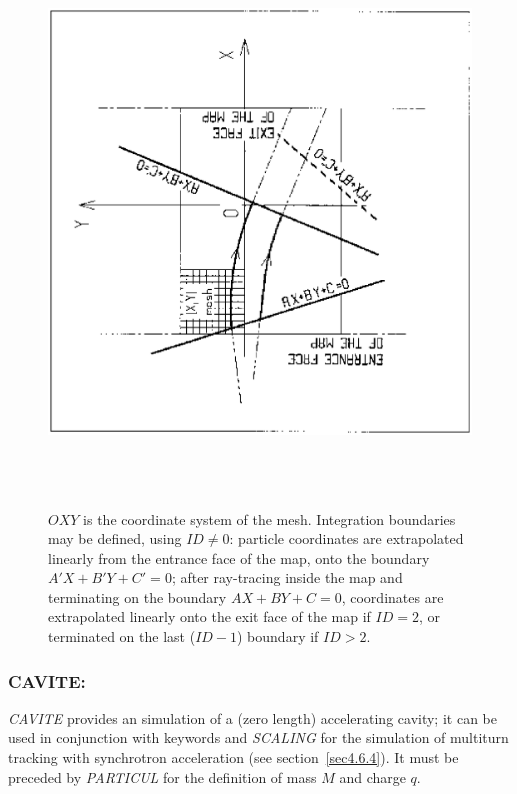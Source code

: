 \begin{figure}[H]
\centerline{\includegraphics[height=15cm,angle=-90]{Fig15.ps}}
\caption[Fig15]{\label{fig15}$OXY $ is the coordinate system of the mesh.
Integration boundaries may be defined, using $ ID\not= 0 $: particle coordinates are
extrapolated linearly from the entrance face of the map, onto the boundary 
$A'X+B'Y+C'=0$; after ray-tracing inside the 
map and terminating on the boundary $AX+BY+C=0$, coordinates are
extrapolated linearly onto the exit face of the map if $ID=2$, or 
 terminated on the last ($ID-1$) boundary if $ID >2$.}
\end{figure}
\vfill
\newpage

\subsubsection*{CAVITE: \CAVITETitl}  \label{CAVITE}
\medskip

\textsl{CAVITE}  provides an  simulation of a (zero length)
accelerating cavity; it can be used in conjunction with  keywords \REBELOTE{} 
and \textsl{SCALING} for 
the simulation of multiturn tracking with synchrotron acceleration (see section~\ref{sec4.6.4}). 
It must be preceded by \textsl{PARTICUL} for the definition 
of mass $ M $ and charge $ q$.   
\bigskip

